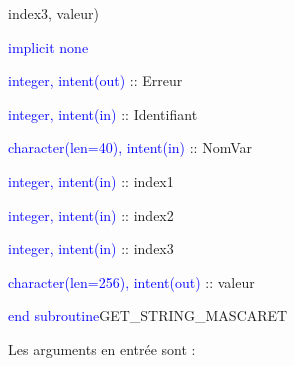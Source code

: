 \documentclass[a4paper,11pt]{article}
\begin{document}
     index3, valeur)
    
        \hspace{1cm}\textcolor{blue}{implicit none}                 
        
        \hspace{1cm} \textcolor{blue}{integer, intent(out)} :: Erreur
        
        \hspace{1cm} \textcolor{blue}{integer, intent(in)}  :: Identifiant
        
        \hspace{1cm} \textcolor{blue}{character(len=40), intent(in)}  :: NomVar
        
        \hspace{1cm} \textcolor{blue}{integer, intent(in)}  :: index1
        
        \hspace{1cm} \textcolor{blue}{integer, intent(in)}  :: index2
        
        \hspace{1cm} \textcolor{blue}{integer, intent(in)}  :: index3
        
        \hspace{1cm} \textcolor{blue}{character(len=256), intent(out)}  :: valeur
        
    \textcolor{blue}{end subroutine}GET\_STRING\_MASCARET

 \vspace{0.5cm}
 
 Les arguments en entr\'ee sont :
 
 \vspace{0.5cm}
 
\end{document}

